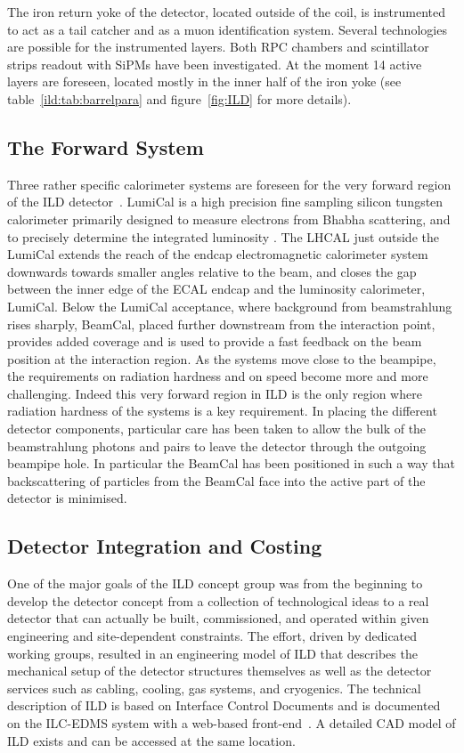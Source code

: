 \documentclass[%
 amsmath,amssymb,
 aps,
 longbibliography,
]{revtex4-1}
\begin{document}
The iron return yoke of the detector, located outside of the coil, is instrumented to act as a tail catcher and as a muon identification system. Several technologies are possible for the instrumented layers. Both RPC chambers and scintillator strips readout with SiPMs have been investigated. At the moment 14 active layers are foreseen, located mostly in the inner half of the iron yoke (see table~\ref{ild:tab:barrelpara} and figure~\ref{fig:ILD} for more details).

\subsection{The Forward System}
Three rather specific calorimeter systems are foreseen for the very forward region of the ILD detector~\cite{Abramowicz:2010bg}. LumiCal is a high precision fine sampling silicon tungsten calorimeter primarily designed to measure electrons from Bhabha scattering, and to precisely determine the integrated luminosity \cite{Bozovic-Jelisavcic:2014aza}. The LHCAL just outside the LumiCal extends the reach of the endcap electromagnetic calorimeter system downwards towards smaller angles relative to the beam, and closes the gap between the inner edge of the ECAL endcap and the luminosity calorimeter, LumiCal.  Below the LumiCal acceptance, where background from beamstrahlung rises sharply, BeamCal, placed further downstream from the interaction point, provides added coverage and is used to provide a fast feedback on the beam position at the interaction region. As the systems move close to the beampipe, the requirements on radiation hardness and on speed become more and more challenging. Indeed this very forward region in ILD is the only region where radiation hardness of the systems is a key requirement. In placing the different detector components, particular care has been taken to allow the bulk of the beamstrahlung photons and pairs to leave the detector through the outgoing beampipe hole. In particular the BeamCal has been positioned in such a way that backscattering of particles from the BeamCal face into the active part of the detector is minimised.

\subsection{Detector Integration and Costing}
One of the major goals of the ILD concept group was from the beginning to develop the detector concept from a collection of technological ideas to a real detector that can actually be built, commissioned, and operated within given engineering and site-dependent constraints. The effort, driven by dedicated working groups, resulted in an engineering model of ILD that describes the mechanical setup of the detector structures themselves as well as the detector services such as cabling, cooling, gas systems, and cryogenics. The technical description of ILD is based on Interface Control Documents and is documented on the ILC-EDMS system with a web-based front-end~\cite{EDMS}. A detailed CAD model of ILD exists and can be accessed at the same location.
\end{document}
